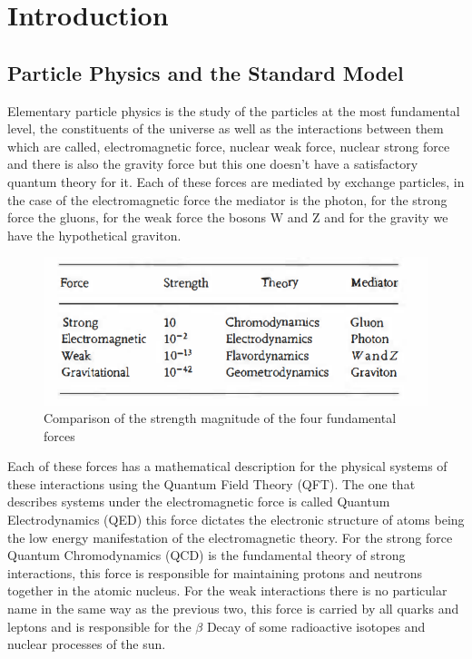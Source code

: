 \chapter{Introduction}
\label{ch1}



\section{Particle Physics and the Standard Model}

Elementary particle physics is the study of the particles at the most fundamental level, the constituents of the universe as well as the interactions between them which are called, electromagnetic force, nuclear weak force, nuclear strong force and there is also the gravity force but this one doesn't have a satisfactory quantum theory for it. Each of these forces are mediated by exchange particles, in the case of the electromagnetic force the mediator is the photon, for the strong force the gluons, for the weak force the bosons W and Z and for the gravity we have the hypothetical graviton.  \cite{Griff}  

\begin{figure}[h]
    \centering
    \includegraphics[scale=1]{table1.png}
    \caption{Comparison of the strength magnitude of the four fundamental forces}
    \label{fig:four-forces}
\end{figure}

Each of these forces has a mathematical description for the physical systems of these interactions using the Quantum Field Theory (QFT). The one that describes systems under the electromagnetic force is called Quantum Electrodynamics (QED) this force dictates the electronic structure of atoms being the low energy manifestation of the electromagnetic theory. For the strong force Quantum Chromodynamics (QCD) is the fundamental theory of strong interactions, this force is responsible for maintaining protons and neutrons together in the atomic nucleus. For the weak interactions there is no particular name in the same way as the previous two, this force is carried by all quarks and leptons and is responsible for the $\beta$ Decay of some radioactive isotopes and nuclear processes of the sun. \cite{mppthomson}   


